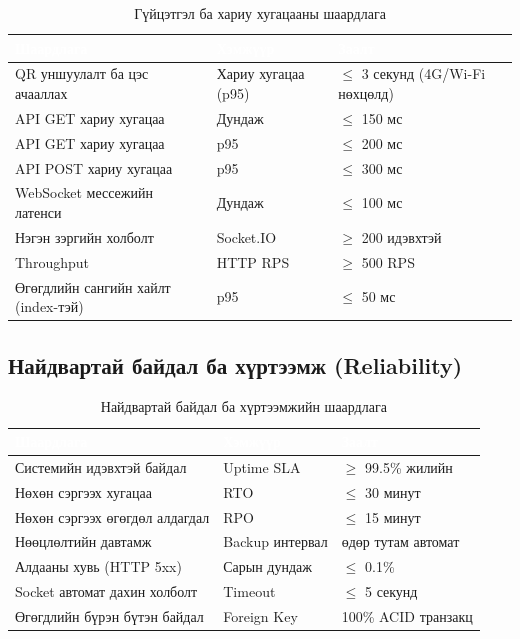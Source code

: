 \begin{table}[htbp]
\caption{Гүйцэтгэл ба хариу хугацааны шаардлага}
\label{tab:nfr_perf}
\centering
\small
\begin{tabularx}{\textwidth}{|L|L|Y|}
\hline
{}
\textcolor{white}{\textbf{Шаардлага}} &
\textcolor{white}{\textbf{Хэмжүүр}} &
\textcolor{white}{\textbf{Заалт}} \\ \hline
QR уншуулалт ба цэс ачааллах & Хариу хугацаа (p95) & $\leq$ 3 секунд (4G/Wi-Fi нөхцөлд) \\ \hline
{}
API GET хариу хугацаа & Дундаж & $\leq$ 150 мс \\ \hline
API GET хариу хугацаа & p95 & $\leq$ 200 мс \\ \hline
{}
API POST хариу хугацаа & p95 & $\leq$ 300 мс \\ \hline
WebSocket мессежийн латенси & Дундаж & $\leq$ 100 мс \\ \hline
{}
Нэгэн зэргийн холболт & Socket.IO & $\geq$ 200 идэвхтэй \\ \hline
Throughput & HTTP RPS & $\geq$ 500 RPS \\ \hline
{}
Өгөгдлийн сангийн хайлт (index-тэй) & p95 & $\leq$ 50 мс \\ \hline
\end{tabularx}
\end{table}

\subsection{Найдвартай байдал ба хүртээмж (Reliability)}

\begin{table}[htbp]
\caption{Найдвартай байдал ба хүртээмжийн шаардлага}
\label{tab:nfr_reliability}
\centering
\small
\begin{tabularx}{\textwidth}{|L|L|Y|}
\hline
{}
\textcolor{white}{\textbf{Шаардлага}} &
\textcolor{white}{\textbf{Хэмжүүр}} &
\textcolor{white}{\textbf{Заалт}} \\ \hline
Системийн идэвхтэй байдал & Uptime SLA & $\geq$ 99.5\% жилийн \\ \hline
{}
Нөхөн сэргээх хугацаа & RTO & $\leq$ 30 минут \\ \hline
Нөхөн сэргээх өгөгдөл алдагдал & RPO & $\leq$ 15 минут \\ \hline
{}
Нөөцлөлтийн давтамж & Backup интервал & өдөр тутам автомат \\ \hline
Алдааны хувь (HTTP 5xx) & Сарын дундаж & $\leq$ 0.1\% \\ \hline
{}
Socket автомат дахин холболт & Timeout & $\leq$ 5 секунд \\ \hline
Өгөгдлийн бүрэн бүтэн байдал & Foreign Key & 100\% ACID транзакц \\ \hline
\end{tabularx}
\end{table}

